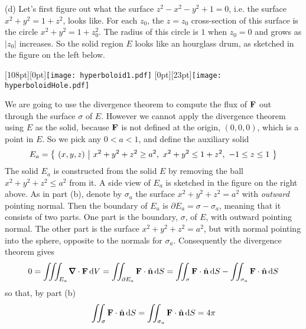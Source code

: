 \begin{solution}
\noindent (d)
Let's first figure out what the surface $z^2 - x^2 - y^2 + 1 = 0$,
i.e. the surface $x^2 + y^2 = 1 +z^2$, looks like. For each $z_0$, the
$z=z_0$ cross-section of this surface is the circle $x^2+y^2=1+z_0^2$.
The radius of this circle is $1$ when $z_0=0$ and grows as $|z_0|$
increases. So the solid region $E$ looks like an hourglass drum, as sketched
in the figure on the left below.

\begin{center}
  \raisebox{-8pt}[108pt][0pt]{\texttt{[image: hyperboloid1.pdf]}}
       \qquad\qquad
       \raisebox{-25pt}[0pt][23pt]{\texttt{[image: hyperboloidHole.pdf]}}
\end{center}

We are going to use the divergence theorem to compute the flux of $\mathbf{F}$
out through the surface $\sigma$ of $E$. However we cannot apply the
divergence theorem using $E$ as the solid, because $\mathbf{F}$ is not defined
at the origin, $(0,0,0)$, which is a point in $E$. So we pick any 
$0<a<1$, and define the auxiliary solid
\begin{equation*}
E_a = \Set{(x,y,z)}{ x^2+y^2+z^2\ge a^2,\ 
                    x^2+y^2\le 1+z^2,\ 
                    -1\le z\le 1}
\end{equation*}
The solid $E_a$ is constructed from the solid $E$ by removing 
the ball $x^2+y^2+z^2\le a^2$ from it. A side view of $E_a$ is sketched 
in the figure on the right above. As in part (b), denote by $\sigma_a$
the surface $x^2+y^2+z^2=a^2$ with \emph{outward} pointing normal.
Then the boundary of $E_a$ is $\partial E_a=\sigma-\sigma_a$, meaning that 
it consists of two parts. One part is the boundary, $\sigma$, of $E$,
with outward pointing normal. The other part is the surface 
$x^2+y^2+z^2=a^2$, but with normal pointing into the sphere, opposite to the
normals for $\sigma_a$. Consequently the divergence theorem gives
\begin{align*}
0=\tripInt_{E_a} \vnabla \cdot \vF\,\dee{V}
 =\dblInt_{\partial E_a} \vF\cdot\hn\,\dee{S}
 = \dblInt_{\sigma} \vF\cdot\hn\,\dee{S}
      -\dblInt_{\sigma_a} \vF\cdot\hn\,\dee{S}
\end{align*}
so that, by part (b)
\begin{align*}
\iint_{\sigma} \mathbf{F}\cdot\hat{\mathbf{n}}\,\mathrm{d}S
=\iint_{\sigma_a} \mathbf{F}\cdot\hat{\mathbf{n}}\,\mathrm{d}S
=4\pi
\end{align*}


\end{solution}
